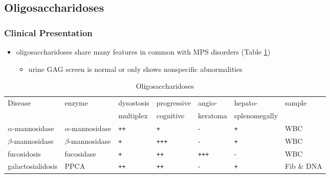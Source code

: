 \documentclass[12pt]{scrartcl}
\begin{document}
\subsection{Oligosaccharidoses}
\label{sec:orgfc1dc87}
\subsubsection{Clinical Presentation}
\label{sec:orgcab48eb}
\begin{itemize}
\item oligosaccharidoses share many features in common with MPS disorders (Table \ref{tab:org1aa9706})
\begin{itemize}
\item urine GAG screen is normal or only shows nonspecific
abnormalities
\end{itemize}
\end{itemize}

\begin{table}[htbp]
\caption{\label{tab:org1aa9706}Oligosaccharidoses}
\centering
\begin{tabular}{lllllll}
Disease & enzyme & dysostosis & progressive & angio- & hepato- & sample\\
 &  & multiplex & cognitive & keratoma & splenomegally & \\
\hline
\(\alpha\)-mannosidase & \(\alpha\)-mannosidase & \texttt{++} & \texttt{+} & - & \texttt{+} & WBC\\
\(\beta\)-mannosidase & \(\beta\)-mannosidase & \texttt{+} & \texttt{+++} & - & \texttt{+} & WBC\\
fucosidosis & fucosidase & \texttt{+} & \texttt{++} & \texttt{+++} & - & WBC\\
galactosialidosis & PPCA & \texttt{++} & \texttt{++} & - & \texttt{+} & Fib \& DNA\\
\end{tabular}
\end{table}
\end{document}
